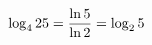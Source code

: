 \documentclass[preview]{standalone}
\begin{document}
\begin{align*}
\special{dvisvgm:raw <g id='unique000'>}\log_4 25 = \frac{\ln 5}{\ln 2} = \log_2 5\special{dvisvgm:raw </g>}
\end{align*}
\end{document}
